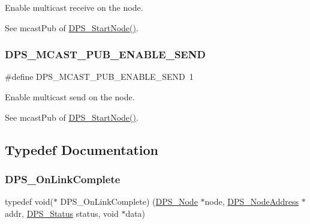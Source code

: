 Enable multicast receive on the node. 

See {\ttfamily mcast\+Pub} of \hyperlink{group__node_ga160d504bfaeb0d3711e0259000340fe3}{D\+P\+S\+\_\+\+Start\+Node()}. \mbox{\label{group__node_ga178a3a6450eeff450820fa34fd82049c}} 
\subsubsection{\texorpdfstring{D\+P\+S\+\_\+\+M\+C\+A\+S\+T\+\_\+\+P\+U\+B\+\_\+\+E\+N\+A\+B\+L\+E\+\_\+\+S\+E\+ND}{DPS\_MCAST\_PUB\_ENABLE\_SEND}}
{\footnotesize\ttfamily \#define D\+P\+S\+\_\+\+M\+C\+A\+S\+T\+\_\+\+P\+U\+B\+\_\+\+E\+N\+A\+B\+L\+E\+\_\+\+S\+E\+ND~1}



Enable multicast send on the node. 

See {\ttfamily mcast\+Pub} of \hyperlink{group__node_ga160d504bfaeb0d3711e0259000340fe3}{D\+P\+S\+\_\+\+Start\+Node()}. 

\subsection{Typedef Documentation}
\mbox{\label{group__node_gaaf70ac42acab8a67693947871e97600f}} 
\subsubsection{\texorpdfstring{D\+P\+S\+\_\+\+On\+Link\+Complete}{DPS\_OnLinkComplete}}
{\footnotesize\ttfamily typedef void($\ast$ D\+P\+S\+\_\+\+On\+Link\+Complete) (\hyperlink{group__node_ga4dd612ab965134321bb57fdb065f121c}{D\+P\+S\+\_\+\+Node} $\ast$node, \hyperlink{group__nodeaddress_ga9e9f56aa38e82b4edcef7eb81e9f5bd2}{D\+P\+S\+\_\+\+Node\+Address} $\ast$addr, \hyperlink{group__status_ga30395a84d3cad9d4ec29848106415038}{D\+P\+S\+\_\+\+Status} status, void $\ast$data)}



